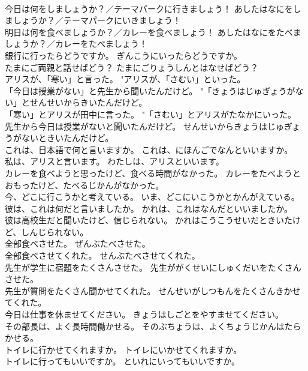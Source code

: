 \documentclass[8pt]{extreport}
\begin{document}
\begin{CJK}{UTF8}{min}
\\	今日は何をしましょうか？／テーマパークに行きましょう！	あしたはなにをしましょうか？／テーマパークにいきましょう！ 
\\	明日は何を食べましょうか？／カレーを食べましょう！	あしたはなにをたべましょうか？／カレーをたべましょう！ 
\\	銀行に行ったらどうですか。	ぎんこうにいったらどうですか。 
\\	たまにご両親と話せばどう？	たまにごりょうしんとはなせばどう？ 
\\	アリスが、「寒い」と言った。	"アリスが、「さむい」といった。 
\\	「今日は授業がない」と先生から聞いたんだけど。	"「きょうはじゅぎょうがない」とせんせいからきいたんだけど。 
\\	「寒い」とアリスが田中に言った。	"「さむい」とアリスがたなかにいった。 
\\	先生から今日は授業がないと聞いたんだけど。	せんせいからきょうはじゅぎょうがないときいたんだけど。 
\\	これは、日本語で何と言いますか。	これは、にほんごでなんといいますか。 
\\	私は、アリスと言います。	わたしは、アリスといいます。 
\\	カレーを食べようと思ったけど、食べる時間がなかった。	カレーをたべようとおもったけど、たべるじかんがなかった。 
\\	今、どこに行こうかと考えている。	いま、どこにいこうかとかんがえている。 
\\	彼は、これは何だと言いましたか。	かれは、これはなんだといいましたか。 
\\	彼は高校生だと聞いたけど、信じられない。	かれはこうこうせいだときいたけど、しんじられない。 
\\	全部食べさせた。	ぜんぶたべさせた。 
\\	全部食べさせてくれた。	せんぶたべさせてくれた。 
\\	先生が学生に宿題をたくさんさせた。	先生ががくせいにしゅくだいをたくさんさせた。 
\\	先生が質問をたくさん聞かせてくれた。	せんせいがしつもんをたくさんきかせてくれた。 
\\	今日は仕事を休ませてください。	きょうはしごとをやすませてください。 
\\	その部長は、よく長時間働かせる。	そのぶちょうは、よくちょうじかんはたらかせる。 
\\	トイレに行かせてくれますか。	トイレにいかせてくれますか。 
\\	トイレに行ってもいいですか。	といれにいってもいいですか。 

\end{CJK}
\end{document}
